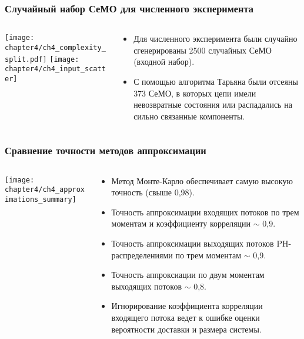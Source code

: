 \begin{frame}
    \frametitle{Случайный набор СеМО для численного эксперимента}
    \begin{columns}
        \begin{column}{0.65\linewidth}
            \begin{center}
                \texttt{[image: chapter4/ch4\_complexity\_split.pdf]}
                \texttt{[image: chapter4/ch4\_input\_scatter]}
            \end{center}
        \end{column}
        \hfill
        \begin{column}{0.33\linewidth}
            \footnotesize
            \begin{itemize}
                \item Для численного эксперимента были случайно сгенерированы 2500 случайных СеМО (входной набор).
                \item С помощью алгоритма Тарьяна были отсеяны 373 СеМО, в которых цепи имели невозвратные состояния или распадались на сильно связанные компоненты.
            \end{itemize}
            \vfill
        \end{column}
    \end{columns}
\end{frame}

\begin{frame}
    \frametitle{Сравнение точности методов аппроксимации}
    \begin{columns}
        \begin{column}{0.55\linewidth}
            \texttt{[image: chapter4/ch4\_approximations\_summary]}
        \end{column}
        \begin{column}{0.43\linewidth}
            \footnotesize
            \begin{itemize}
                \item Метод Монте-Карло обеспечивает самую высокую точность (свыше 0,98).
                \item Точность аппроксимации входящих потоков по трем моментам и коэффициенту корреляции $\sim$ 0,9.
                \item Точность аппроксимации выходящих потоков PH-распределениями по трем моментам $\sim$ 0,9.
                \item Точность аппроксиации по двум моментам выходящих потоков $\sim$ 0,8.
                \item Игнорирование коэффициента корреляции входящего потока ведет к ошибке оценки вероятности доставки и размера системы.
            \end{itemize}
        \end{column}
    \end{columns}
\end{frame}

